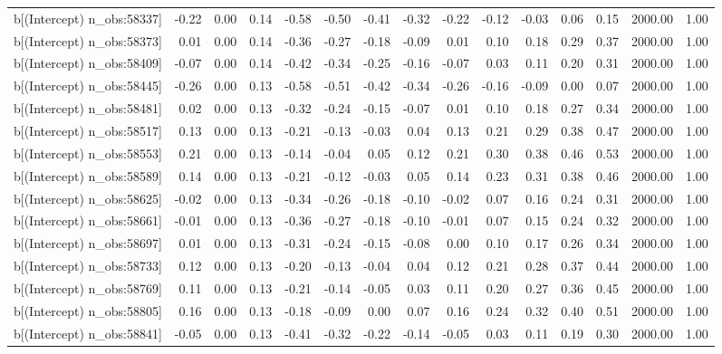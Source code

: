 \begin{table}[ht]
\begin{tabular}{rrrrrrrrrrrrrrr}
  b[(Intercept) n\_obs:58337] & -0.22 & 0.00 & 0.14 & -0.58 & -0.50 & -0.41 & -0.32 & -0.22 & -0.12 & -0.03 & 0.06 & 0.15 & 2000.00 & 1.00 \\ 
  b[(Intercept) n\_obs:58373] & 0.01 & 0.00 & 0.14 & -0.36 & -0.27 & -0.18 & -0.09 & 0.01 & 0.10 & 0.18 & 0.29 & 0.37 & 2000.00 & 1.00 \\ 
  b[(Intercept) n\_obs:58409] & -0.07 & 0.00 & 0.14 & -0.42 & -0.34 & -0.25 & -0.16 & -0.07 & 0.03 & 0.11 & 0.20 & 0.31 & 2000.00 & 1.00 \\ 
  b[(Intercept) n\_obs:58445] & -0.26 & 0.00 & 0.13 & -0.58 & -0.51 & -0.42 & -0.34 & -0.26 & -0.16 & -0.09 & 0.00 & 0.07 & 2000.00 & 1.00 \\ 
  b[(Intercept) n\_obs:58481] & 0.02 & 0.00 & 0.13 & -0.32 & -0.24 & -0.15 & -0.07 & 0.01 & 0.10 & 0.18 & 0.27 & 0.34 & 2000.00 & 1.00 \\ 
  b[(Intercept) n\_obs:58517] & 0.13 & 0.00 & 0.13 & -0.21 & -0.13 & -0.03 & 0.04 & 0.13 & 0.21 & 0.29 & 0.38 & 0.47 & 2000.00 & 1.00 \\ 
  b[(Intercept) n\_obs:58553] & 0.21 & 0.00 & 0.13 & -0.14 & -0.04 & 0.05 & 0.12 & 0.21 & 0.30 & 0.38 & 0.46 & 0.53 & 2000.00 & 1.00 \\ 
  b[(Intercept) n\_obs:58589] & 0.14 & 0.00 & 0.13 & -0.21 & -0.12 & -0.03 & 0.05 & 0.14 & 0.23 & 0.31 & 0.38 & 0.46 & 2000.00 & 1.00 \\ 
  b[(Intercept) n\_obs:58625] & -0.02 & 0.00 & 0.13 & -0.34 & -0.26 & -0.18 & -0.10 & -0.02 & 0.07 & 0.16 & 0.24 & 0.31 & 2000.00 & 1.00 \\ 
  b[(Intercept) n\_obs:58661] & -0.01 & 0.00 & 0.13 & -0.36 & -0.27 & -0.18 & -0.10 & -0.01 & 0.07 & 0.15 & 0.24 & 0.32 & 2000.00 & 1.00 \\ 
  b[(Intercept) n\_obs:58697] & 0.01 & 0.00 & 0.13 & -0.31 & -0.24 & -0.15 & -0.08 & 0.00 & 0.10 & 0.17 & 0.26 & 0.34 & 2000.00 & 1.00 \\ 
  b[(Intercept) n\_obs:58733] & 0.12 & 0.00 & 0.13 & -0.20 & -0.13 & -0.04 & 0.04 & 0.12 & 0.21 & 0.28 & 0.37 & 0.44 & 2000.00 & 1.00 \\ 
  b[(Intercept) n\_obs:58769] & 0.11 & 0.00 & 0.13 & -0.21 & -0.14 & -0.05 & 0.03 & 0.11 & 0.20 & 0.27 & 0.36 & 0.45 & 2000.00 & 1.00 \\ 
  b[(Intercept) n\_obs:58805] & 0.16 & 0.00 & 0.13 & -0.18 & -0.09 & 0.00 & 0.07 & 0.16 & 0.24 & 0.32 & 0.40 & 0.51 & 2000.00 & 1.00 \\ 
  b[(Intercept) n\_obs:58841] & -0.05 & 0.00 & 0.13 & -0.41 & -0.32 & -0.22 & -0.14 & -0.05 & 0.03 & 0.11 & 0.19 & 0.30 & 2000.00 & 1.00 \\ 

\end{tabular}
\end{table}
